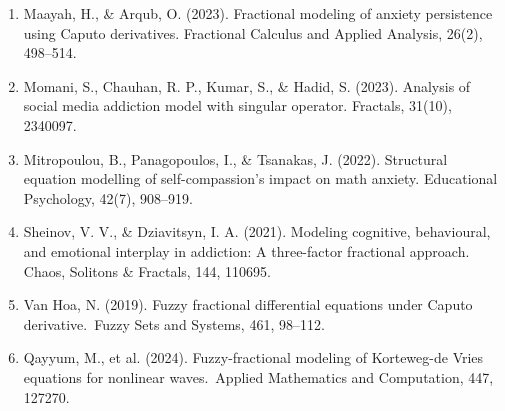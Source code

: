 \documentclass[10pt]{NSP1}
\begin{document}
\begin{enumerate}
  \item Maayah, H., \& Arqub, O. (2023). Fractional modeling of anxiety persistence using Caputo derivatives. Fractional Calculus and Applied Analysis, 26(2), 498–514. 
  \item Momani, S., Chauhan, R. P., Kumar, S., \& Hadid, S. (2023). Analysis of social media addiction model with singular operator. Fractals, 31(10), 2340097.
  \item Mitropoulou, B., Panagopoulos, I., \& Tsanakas, J. (2022). Structural equation modelling of self-compassion's impact on math anxiety. Educational Psychology, 42(7), 908–919. 
  \item Sheinov, V. V., \& Dziavitsyn, I. A. (2021). Modeling cognitive, behavioural, and emotional interplay in addiction: A three-factor fractional approach. Chaos, Solitons \& Fractals, 144, 110695. 
  \item Van Hoa, N. (2019). Fuzzy fractional differential equations under Caputo derivative. Fuzzy Sets and Systems, 461, 98–112. 
  \item Qayyum, M., et al. (2024). Fuzzy-fractional modeling of Korteweg-de Vries equations for nonlinear waves. Applied Mathematics and Computation, 447, 127270. 
\end{enumerate}
\end{document}
